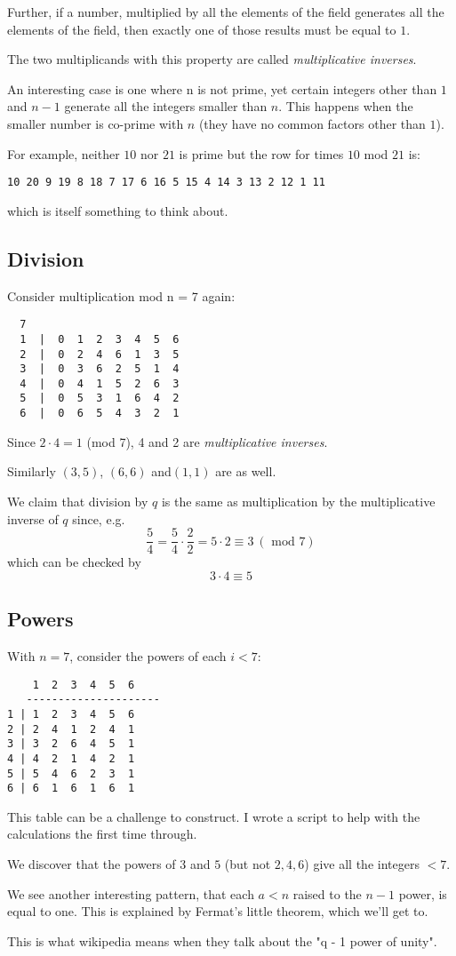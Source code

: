 \documentclass[11pt, oneside]{article}
\begin{document}
Further, if a number, multiplied by all the elements of the field generates all the elements of the field, then  exactly one of those results must be equal to $1$.  

The two multiplicands with this property are called \emph{multiplicative inverses}. 

An interesting case is one where n is not prime, yet certain integers other than $1$ and $n-1$ generate all the integers smaller than $n$.  This happens when the smaller number is co-prime with $n$ (they have no common factors other than $1$).

For example, neither $10$ nor $21$ is prime but the row for times $10$ mod $21$ is:

\begin{verbatim}
10 20 9 19 8 18 7 17 6 16 5 15 4 14 3 13 2 12 1 11
\end{verbatim}

which is itself something to think about.

\subsection*{Division}

Consider multiplication mod n = 7 again:

\begin{verbatim}
  7
  1  |  0  1  2  3  4  5  6
  2  |  0  2  4  6  1  3  5
  3  |  0  3  6  2  5  1  4
  4  |  0  4  1  5  2  6  3
  5  |  0  5  3  1  6  4  2
  6  |  0  6  5  4  3  2  1
\end{verbatim}

Since $2 \cdot 4 = 1$ (mod 7), 4 and 2 are \emph{multiplicative inverses}.

Similarly $(3,5)$, $(6,6)$ and$(1,1)$ are as well.

We claim that division by $q$ is the same as multiplication by the multiplicative inverse of $q$ since, e.g.
\[  \frac{5}{4} = \frac{5}{4} \cdot \frac{2}{2} = 5 \cdot 2 \equiv 3 \ (\text{ mod } 7) \]
which can be checked by
\[ 3 \cdot 4 \equiv 5 \]

\subsection*{Powers}

With $n = 7$, consider the powers of each $ i < 7$:

\begin{verbatim}
    1  2  3  4  5  6
   ---------------------
1 | 1  2  3  4  5  6
2 | 2  4  1  2  4  1
3 | 3  2  6  4  5  1
4 | 4  2  1  4  2  1
5 | 5  4  6  2  3  1  
6 | 6  1  6  1  6  1
\end{verbatim}

This table can be a challenge to construct.  I wrote a script to help with the calculations the first time through. 

We discover that the powers of $3$ and $5$ (but not $2,4,6$) give all the integers $<7$.  

We see another interesting pattern, that each $a < n$ raised to the $n-1$ power, is equal to one.  This is explained by Fermat's little theorem, which we'll get to.

This is what wikipedia means when they talk about the "q - 1 power of unity".
\end{document}
